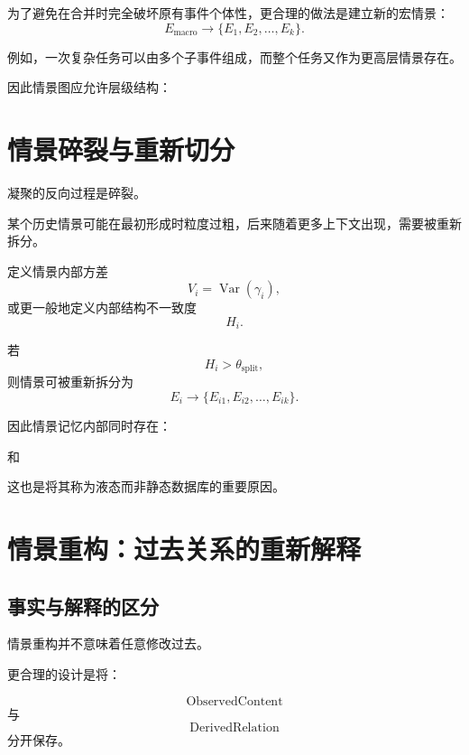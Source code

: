 为了避免在合并时完全破坏原有事件个体性，更合理的做法是建立新的宏情景：
\[
\boxed{
E_{\mathrm{macro}}
\rightarrow
\{E_1,E_2,\ldots,E_k\}.
}
\]

例如，一次复杂任务可以由多个子事件组成，而整个任务又作为更高层情景存在。

因此情景图应允许层级结构：
\begin{statementbox}
\centering
{}
\end{statementbox}

\section{情景碎裂与重新切分}

凝聚的反向过程是碎裂。

某个历史情景可能在最初形成时粒度过粗，后来随着更多上下文出现，需要被重新拆分。

定义情景内部方差
\[
V_i
=
\operatorname{Var}(\gamma_i),
\]
或更一般地定义内部结构不一致度
\[
H_i.
\]

若
\[
H_i>\theta_{\mathrm{split}},
\]
则情景可被重新拆分为
\[
\boxed{
E_i
\rightarrow
\{E_{i1},E_{i2},\ldots,E_{ik}\}.
}
\]

因此情景记忆内部同时存在：
\begin{statementbox}
\centering
{}
\end{statementbox}
和
\begin{statementbox}
\centering
{}
\end{statementbox}

这也是将其称为液态而非静态数据库的重要原因。

\section{情景重构：过去关系的重新解释}

\subsection{事实与解释的区分}

情景重构并不意味着任意修改过去。

更合理的设计是将：

\[
\mathrm{ObservedContent}
\]
与
\[
\mathrm{DerivedRelation}
\]
分开保存。

